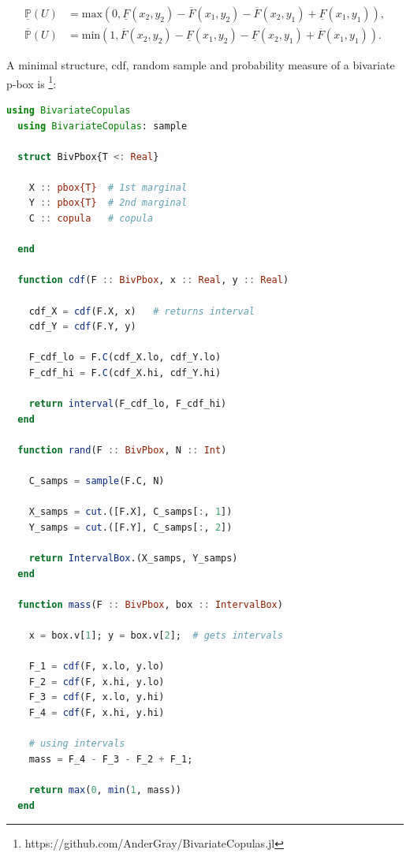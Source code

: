 \documentclass{juliacon}
\begin{document}
\begin{align*}
  \underline{\mathbb{P}}(U) &= \text{max}(0, \underline{F}(x_{2}, y_{2}) - \overline{F}(x_{1}, y_{2}) - \overline{F}(x_{2}, y_{1}) + \underline{F}(x_{1}, y_{1})) ,\\ 
  \overline{\mathbb{P}}(U)  &= \text{min}(1, \overline{F}(x_{2}, y_{2}) - \underline{F}(x_{1}, y_{2}) - \underline{F}(x_{2}, y_{1}) + \overline{F}(x_{1}, y_{1}) ).
\end{align*}


A minimal structure, cdf, random sample and probability measure of a bivariate p-box is \footnote{https://github.com/AnderGray/BivariateCopulas.jl}:

\begin{lstlisting}[language = Julia]
  using BivariateCopulas
  using BivariateCopulas: sample

  struct BivPbox{T <: Real}

    X :: pbox{T}  # 1st marginal
    Y :: pbox{T}  # 2nd marginal
    C :: copula   # copula

  end

  function cdf(F :: BivPbox, x :: Real, y :: Real)

    cdf_X = cdf(F.X, x)   # returns interval
    cdf_Y = cdf(F.Y, y)

    F_cdf_lo = F.C(cdf_X.lo, cdf_Y.lo)
    F_cdf_hi = F.C(cdf_X.hi, cdf_Y.hi)

    return interval(F_cdf_lo, F_cdf_hi)
  end

  function rand(F :: BivPbox, N :: Int)

    C_samps = sample(F.C, N)

    X_samps = cut.([F.X], C_samps[:, 1])
    Y_samps = cut.([F.Y], C_samps[:, 2])

    return IntervalBox.(X_samps, Y_samps)
  end

  function mass(F :: BivPbox, box :: IntervalBox)

    x = box.v[1]; y = box.v[2];  # gets intervals

    F_1 = cdf(F, x.lo, y.lo)
    F_2 = cdf(F, x.hi, y.lo)
    F_3 = cdf(F, x.lo, y.hi)
    F_4 = cdf(F, x.hi, y.hi)

    # using intervals
    mass = F_4 - F_3 - F_2 + F_1;

    return max(0, min(1, mass))
  end
\end{lstlisting}
\end{document}

